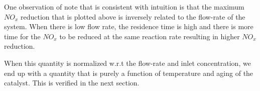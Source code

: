 One observation of note that is consistent with intuition is that the maximum $NO_x$ reduction that is plotted above is
inversely related to the flow-rate of the system. When there is low flow rate, the residence time is high and there is
more time for the $NO_x$ to be reduced at the same reaction rate resulting in higher $NO_x$ reduction.

When this quantity is normalized w.r.t the flow-rate and inlet concentration, we end up with a quantity that is purely a function of temperature  and aging of the catalyst. This is verified in the next section.
